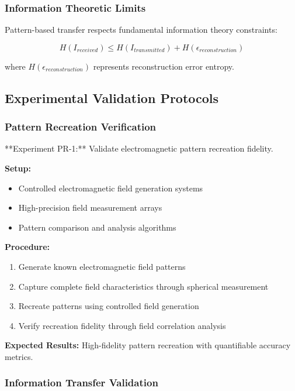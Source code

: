 \documentclass[12pt,a4paper]{article}
\begin{document}
\subsubsection{Information Theoretic Limits}

Pattern-based transfer respects fundamental information theory constraints:

\begin{equation}
H(I_{received}) \leq H(I_{transmitted}) + H(\epsilon_{reconstruction})
\label{eq:information_theory_limit}
\end{equation}

where $H(\epsilon_{reconstruction})$ represents reconstruction error entropy.

\subsection{Experimental Validation Protocols}

\subsubsection{Pattern Recreation Verification}

**Experiment PR-1:** Validate electromagnetic pattern recreation fidelity.

\textbf{Setup:}
\begin{itemize}
\item Controlled electromagnetic field generation systems
\item High-precision field measurement arrays
\item Pattern comparison and analysis algorithms
\end{itemize}

\textbf{Procedure:}
\begin{enumerate}
\item Generate known electromagnetic field patterns
\item Capture complete field characteristics through spherical measurement
\item Recreate patterns using controlled field generation
\item Verify recreation fidelity through field correlation analysis
\end{enumerate}

\textbf{Expected Results:} High-fidelity pattern recreation with quantifiable accuracy metrics.

\subsubsection{Information Transfer Validation}
\end{document}
